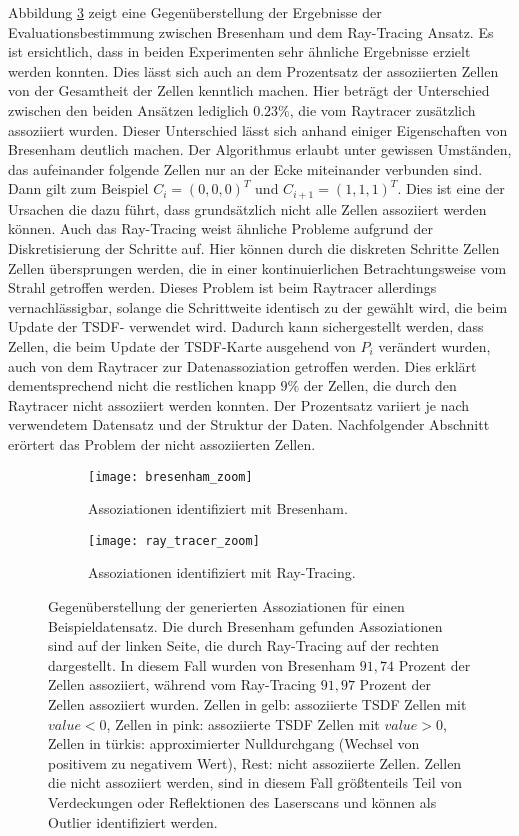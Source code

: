 Abbildung \ref{fig:bresenham_vs_raytrace} zeigt eine Gegenüberstellung der Ergebnisse der Evaluationsbestimmung zwischen Bresenham und dem Ray-Tracing Ansatz. Es ist ersichtlich, dass in beiden Experimenten sehr ähnliche Ergebnisse erzielt werden konnten. Dies lässt sich auch an dem Prozentsatz der assoziierten Zellen von der Gesamtheit der Zellen kenntlich machen. Hier beträgt der Unterschied zwischen den beiden Ansätzen lediglich $0.23 \%$, die vom Raytracer zusätzlich assoziiert wurden. Dieser Unterschied lässt sich anhand einiger Eigenschaften von Bresenham deutlich machen. Der Algorithmus erlaubt unter gewissen Umständen, das aufeinander folgende Zellen nur an der Ecke miteinander verbunden sind. Dann gilt zum Beispiel  $C_i = (0,0,0)^T$ und $C_{i+1} = (1,1,1)^T$. Dies ist eine der Ursachen die dazu führt, dass grundsätzlich nicht alle Zellen assoziiert werden können. Auch das Ray-Tracing weist ähnliche Probleme aufgrund der Diskretisierung der Schritte auf. Hier können durch die diskreten Schritte Zellen Zellen übersprungen werden, die in einer kontinuierlichen Betrachtungsweise vom Strahl getroffen werden. Dieses Problem ist beim Raytracer allerdings vernachlässigbar, solange die Schrittweite identisch zu der gewählt wird, die beim Update der TSDF- verwendet wird. Dadurch kann sichergestellt werden, dass Zellen, die beim Update der TSDF-Karte ausgehend von $P_i$ verändert wurden, auch von dem Raytracer zur Datenassoziation getroffen werden. Dies erklärt dementsprechend nicht die restlichen knapp $9\%$ der Zellen, die durch den Raytracer nicht assoziiert werden konnten. Der Prozentsatz variiert je nach verwendetem Datensatz und der Struktur der Daten. Nachfolgender Abschnitt erörtert das Problem der nicht assoziierten Zellen.


\begin{figure}
	\centering
	\begin{subfigure}{.5\textwidth}
 		 \centering
  		 \texttt{[image: bresenham\_zoom]}
  		 \centering \caption{Assoziationen identifiziert mit Bresenham.}
  		 \label{fig:sp_bresenham}
	\end{subfigure}%
	\begin{subfigure}{.5\textwidth}
    	\centering
  		\texttt{[image: ray\_tracer\_zoom]}
  		\centering \caption{Assoziationen identifiziert mit Ray-Tracing.}
  		\label{fig:sp_raytrace}
	\end{subfigure}
	\caption{Gegenüberstellung der generierten Assoziationen für einen Beispieldatensatz. Die durch Bresenham gefunden Assoziationen sind auf der linken Seite, die durch Ray-Tracing auf der rechten dargestellt. In diesem Fall wurden von Bresenham $91,74$ Prozent der Zellen assoziiert, während vom Ray-Tracing $91,97$ Prozent der Zellen assoziiert wurden. Zellen in gelb: assoziierte TSDF Zellen mit $value < 0$, Zellen in pink: assoziierte TSDF Zellen mit $value > 0$, Zellen in türkis: approximierter Nulldurchgang (Wechsel von positivem zu negativem Wert), Rest: nicht assoziierte Zellen. Zellen die nicht assoziiert werden, sind in diesem Fall größtenteils Teil von Verdeckungen oder Reflektionen des Laserscans und können als Outlier identifiziert werden.}
	\label{fig:bresenham_vs_raytrace}
\end{figure}

